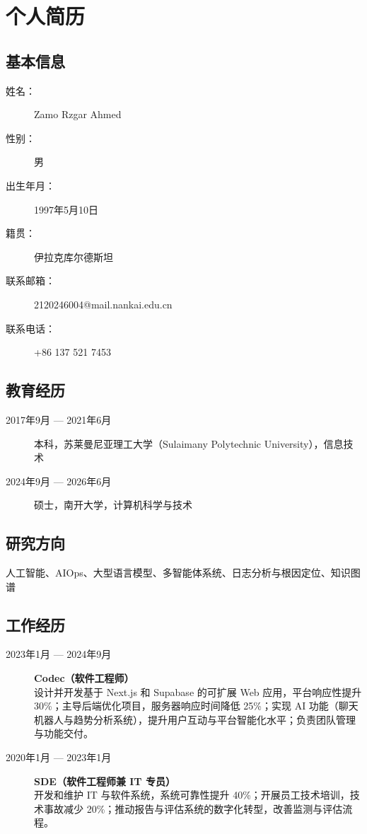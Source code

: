 
\chapter*{个人简历}

\section*{基本信息}

\begin{description}
  \item[姓名：] Zamo Rzgar Ahmed
  \item[性别：] 男
  \item[出生年月：] 1997年5月10日
  \item[籍贯：] 伊拉克库尔德斯坦
  \item[联系邮箱：] 2120246004@mail.nankai.edu.cn
  \item[联系电话：] +86 137 521 7453
\end{description}

\section*{教育经历}

\begin{description}
  \item[2017年9月 --- 2021年6月] \quad 本科，苏莱曼尼亚理工大学（Sulaimany Polytechnic University），信息技术
  \item[2024年9月 --- 2026年6月] \quad 硕士，南开大学，计算机科学与技术
\end{description}

\section*{研究方向}

人工智能、AIOps、大型语言模型、多智能体系统、日志分析与根因定位、知识图谱

\section*{工作经历}

\begin{description}
  \item[2023年1月 --- 2024年9月] \quad \textbf{Codec（软件工程师）}\\
    设计并开发基于 Next.js 和 Supabase 的可扩展 Web 应用，平台响应性提升 30\%；主导后端优化项目，服务器响应时间降低 25\%；实现 AI 功能（聊天机器人与趋势分析系统），提升用户互动与平台智能化水平；负责团队管理与功能交付。

  \item[2020年1月 --- 2023年1月] \quad \textbf{SDE（软件工程师兼 IT 专员）}\\
    开发和维护 IT 与软件系统，系统可靠性提升 40\%；开展员工技术培训，技术事故减少 20\%；推动报告与评估系统的数字化转型，改善监测与评估流程。
\end{description}

